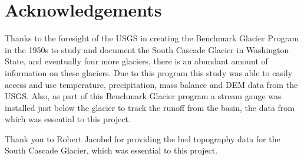 \documentclass{article}
\begin{document}
\section*{Acknowledgements}
Thanks to the foresight of the USGS in creating the Benchmark Glacier Program in the 1950s to study and document the South Cascade Glacier in Washington State, 
and eventually four more glaciers, there is an abundant amount of information on these glaciers. Due to this program this study was able to 
easily access and use temperature, precipitation, mass balance and DEM data from the USGS. Also, as part of this Benchmark Glacier program a 
stream gauge was installed just below the glacier to track the runoff from the basin, the data from which was essential to this project.

Thank you to Robert Jacobel for providing the bed topography data for the South Cascade Glacier, which was essential to this project.
\end{document}
